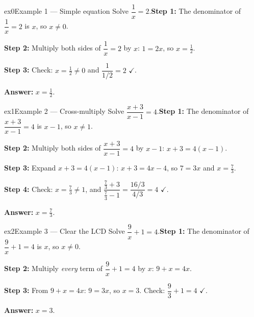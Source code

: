 \documentclass[11pt]{article}
\begin{document}

\begin{example}{ex0}{Example 1 --- Simple equation}
Solve $\dfrac1x=2$.\soln \textbf{Step 1:} The denominator of $\dfrac1x=2$ is $x$, so $x\ne0$.

\textbf{Step 2:} Multiply both sides of $\dfrac1x=2$ by $x$: $1=2x$, so $x=\tfrac12$.

\textbf{Step 3:} Check: $x=\tfrac12\ne0$ and $\dfrac{1}{1/2}=2$ $\checkmark$.

\textbf{Answer:} $x=\tfrac12$.
\end{example}

\begin{example}{ex1}{Example 2 --- Cross-multiply}
Solve $\dfrac{x+3}{x-1}=4$.\soln \textbf{Step 1:} The denominator of $\dfrac{x+3}{x-1}=4$ is $x-1$, so $x\ne1$.

\textbf{Step 2:} Multiply both sides of $\dfrac{x+3}{x-1}=4$ by $x-1$: $x+3=4(x-1)$.

\textbf{Step 3:} Expand $x+3=4(x-1)$: $x+3=4x-4$, so $7=3x$ and $x=\tfrac73$.

\textbf{Step 4:} Check: $x=\tfrac73\ne1$, and $\dfrac{\frac73+3}{\frac73-1}=\dfrac{16/3}{4/3}=4$ $\checkmark$.

\textbf{Answer:} $x=\tfrac73$.
\end{example}

\begin{example}{ex2}{Example 3 --- Clear the LCD}
Solve $\dfrac9x+1=4$.\soln \textbf{Step 1:} The denominator of $\dfrac9x+1=4$ is $x$, so $x\ne0$.

\textbf{Step 2:} Multiply \emph{every} term of $\dfrac9x+1=4$ by $x$: $9+x=4x$.

\textbf{Step 3:} From $9+x=4x$: $9=3x$, so $x=3$. Check: $\dfrac93+1=4$ $\checkmark$.

\textbf{Answer:} $x=3$.
\end{example}
\end{document}
